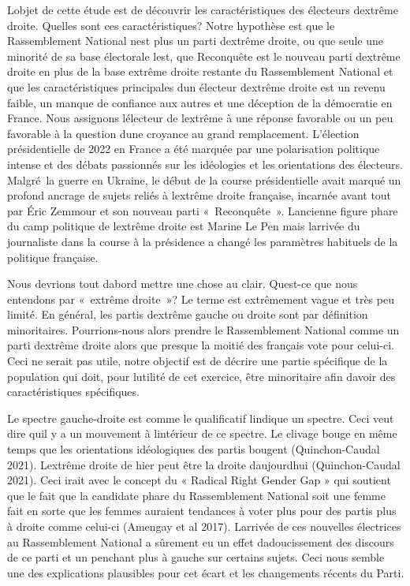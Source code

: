 \documentclass[
  letterpaper,
  DIV=11,
  numbers=noendperiod]{scrartcl}
\begin{document}
L\textquotesingle objet de cette étude est de découvrir les
caractéristiques des électeurs d\textquotesingle extrême droite. Quelles
sont ces caractéristiques? Notre hypothèse est que le Rassemblement
National n\textquotesingle est plus un parti d\textquotesingle extrême
droite, ou que seule une minorité de sa base électorale
l\textquotesingle est, que Reconquête est le nouveau parti
d\textquotesingle extrême droite en plus de la base extrême droite
restante du Rassemblement National et que les caractéristiques
principales d\textquotesingle un électeur d\textquotesingle extrême
droite est un revenu faible, un manque de confiance aux autres et une
déception de la démocratie en France. Nous assignons
l\textquotesingle électeur de l\textquotesingle extrême à une réponse
favorable ou un peu favorable à la question d\textquotesingle une
croyance au grand remplacement. L'élection présidentielle de 2022 en
France a été marquée par une polarisation politique intense et des
débats passionnés sur les idéologies et les orientations des électeurs.
Malgré~la guerre en Ukraine, le début de la course présidentielle avait
marqué un profond ancrage de sujets reliés à l\textquotesingle extrême
droite française, incarnée avant tout par Éric Zemmour et son nouveau
parti «~Reconquête~». L\textquotesingle ancienne figure phare du camp
politique de l\textquotesingle extrême droite est Marine Le Pen mais
l\textquotesingle arrivée du journaliste dans la course à la présidence
a changé les paramètres habituels de la politique française.

Nous devrions tout d\textquotesingle abord mettre une chose au clair.
Qu\textquotesingle est-ce que nous entendons par «~extrême droite~»? Le
terme est extrêmement vague et très peu limité. En général, les partis
d\textquotesingle extrême gauche ou droite sont par définition
minoritaires. Pourrions-nous alors prendre le Rassemblement National
comme un parti d\textquotesingle extrême droite alors que presque la
moitié des français vote pour celui-ci. Ceci ne serait pas utile, notre
objectif est de décrire une partie spécifique de la population qui doit,
pour l\textquotesingle utilité de cet exercice, être minoritaire afin
d\textquotesingle avoir des caractéristiques spécifiques.

Le spectre gauche-droite est comme le qualificatif
l\textquotesingle indique un spectre. Ceci veut dire
qu\textquotesingle il y a un mouvement à l\textquotesingle intérieur de
ce spectre. Le clivage bouge en même temps que les orientations
idéologiques des partis bougent (Quinchon-Caudal 2021).
L\textquotesingle extrême droite de hier peut être la droite
d\textquotesingle aujourd\textquotesingle hui (Quinchon-Caudal 2021).
Ceci irait avec le concept du « Radical Right Gender Gap » qui soutient
que le fait que la candidate phare du Rassemblement National soit une
femme fait en sorte que les femmes auraient tendances à voter plus pour
des partis plus à droite comme celui-ci (Amengay et al 2017).
L\textquotesingle arrivée de ces nouvelles électrices au Rassemblement
National a sûrement eu un effet d\textquotesingle adoucissement des
discours de ce parti et un penchant plus à gauche sur certains sujets.
Ceci nous semble une des explications plausibles pour cet écart et les
changements récents du Parti.
\end{document}
